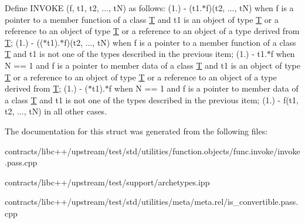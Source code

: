 Define I\+N\+V\+O\+KE (f, t1, t2, ..., tN) as follows\+: (1.) -\/ (t1.$\ast$f)(t2, ..., tN) when f is a pointer to a member function of a class \mbox{\hyperlink{struct_t}{T}} and t1 is an object of type \mbox{\hyperlink{struct_t}{T}} or a reference to an object of type \mbox{\hyperlink{struct_t}{T}} or a reference to an object of a type derived from \mbox{\hyperlink{struct_t}{T}}; (1.) -\/ (($\ast$t1).$\ast$f)(t2, ..., tN) when f is a pointer to a member function of a class \mbox{\hyperlink{struct_t}{T}} and t1 is not one of the types described in the previous item; (1.) -\/ t1.$\ast$f when N == 1 and f is a pointer to member data of a class \mbox{\hyperlink{struct_t}{T}} and t1 is an object of type \mbox{\hyperlink{struct_t}{T}} or a reference to an object of type \mbox{\hyperlink{struct_t}{T}} or a reference to an object of a type derived from \mbox{\hyperlink{struct_t}{T}}; (1.) -\/ ($\ast$t1).$\ast$f when N == 1 and f is a pointer to member data of a class \mbox{\hyperlink{struct_t}{T}} and t1 is not one of the types described in the previous item; (1.) -\/ f(t1, t2, ..., tN) in all other cases. 

The documentation for this struct was generated from the following files\+:\begin{DoxyCompactItemize}
\item 
contracts/libc++/upstream/test/std/utilities/function.\+objects/func.\+invoke/invoke.\+pass.\+cpp\item 
contracts/libc++/upstream/test/support/archetypes.\+ipp\item 
contracts/libc++/upstream/test/std/utilities/meta/meta.\+rel/is\+\_\+convertible.\+pass.\+cpp\end{DoxyCompactItemize}
